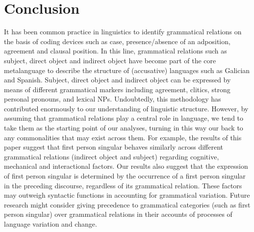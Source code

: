 \documentclass[output=paper]{langscibook}
\begin{document}
\section{Conclusion}

It has been common practice in linguistics to identify grammatical relations on the basis of coding devices such as case, presence/absence of an adposition, agreement and clausal position. In this line, grammatical relations such as subject, direct object and indirect object have become part of the core metalanguage to describe the structure of (accusative) languages such as Galician and Spanish. Subject, direct object and indirect object can be expressed by means of different grammatical markers including agreement, clitics, strong personal pronouns, and lexical NPs. Undoubtedly, this methodology has contributed enormously to our understanding of linguistic structure. However, by assuming that grammatical relations play a central role in language, we tend to take them as the starting point of our analyses, turning in this way our back to any commonalities that may exist across them. For example, the results of this paper suggest that first person singular behaves similarly across different grammatical relations (indirect object and subject) regarding cognitive, mechanical and interactional factors. Our results also suggest that the expression of first person singular is determined by the occurrence of a first person singular in the preceding discourse, regardless of its grammatical relation. These factors may outweigh syntactic functions in accounting for grammatical variation. Future research might consider giving precedence to grammatical categories (such as first person singular) over grammatical relations in their accounts of processes of language variation and change.


\printbibliography[heading=subbibliography,notkeyword=this]
\end{document}
